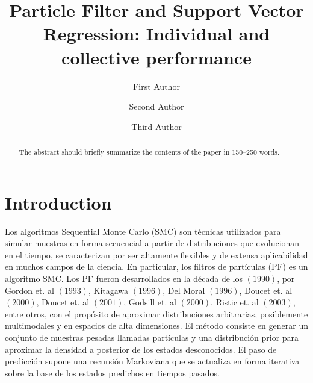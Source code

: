 \documentclass[runningheads]{llncs}
\begin{document}
\title{Particle Filter and Support Vector Regression: Individual and collective performance}
%
%
\author{First Author \and
Second Author \and
Third Author}
%
%
%
\maketitle              %
%
\begin{abstract}
The abstract should briefly summarize the contents of the paper in
150--250 words.

\end{abstract}
%
%
%

\section{Introduction}
\label{sec:intro}
Los algoritmos Sequential Monte Carlo (SMC) son técnicas utilizados para simular muestras en forma secuencial a partir de distribuciones que evolucionan en el tiempo, se caracterizan por ser altamente flexibles y de extensa aplicabilidad en muchos campos de la ciencia.
 En particular, los filtros de partículas (PF) es un algoritmo SMC. Los PF fueron desarrollados en la década de los $(1990)$, por  Gordon et. al $(1993)$, Kitagawa $(1996)$, Del Moral $(1996)$, Doucet et. al $(2000)$, Doucet et. al $(2001)$, Godsill et. al $(2000)$, Ristic et. al $(2003)$, entre otros, con el propósito de aproximar distribuciones arbitrarias, posiblemente 
 multimodales y en espacios de alta dimensiones. El método consiste en generar un conjunto de muestras pesadas llamadas partículas y una
 distribución prior para aproximar la densidad a posterior de los estados desconocidos. El paso de predicción supone una recursión Markoviana que se actualiza en forma iterativa  sobre la base de los estados 
 predichos en tiempos pasados.\\
%
\end{document}
